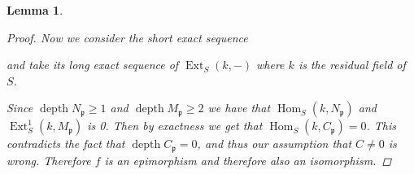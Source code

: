 \documentclass[11pt, a4paper, english]{article}
\numberwithin{prop}{section}
\newtheorem{lemma}{Lemma}
\numberwithin{lemma}{section}
\numberwithin{theorem}{section}
\numberwithin{defin}{section}
\numberwithin{example}{section}
\DeclareMathOperator{\Hom}{Hom}
\DeclareMathOperator{\Ext}{Ext}
\DeclareMathOperator{\depth}{depth}
\begin{document}
\begin{lemma}
\begin{proof}
Now we consider the short exact sequence
\begin{center}
\end{center}
and take its long exact sequence of $\Ext_S(k, -)$ where $k$ is the residual field of $S$.
\begin{center}
\end{center}
Since $\depth N_\mathfrak{p} \geq 1$ and $\depth M_\mathfrak{p} \geq 2$ we have that $\Hom_S(k, N_\mathfrak{p})$ and $\Ext^1_S(k, M_\mathfrak{p})$ is 0. Then by exactness we get that $\Hom_S(k, C_\mathfrak{p}) = 0$. This contradicts the fact that $\depth C_\mathfrak{p} = 0$, and thus our assumption that $C \neq 0$ is wrong. Therefore $f$ is an epimorphism and therefore also an isomorphism.
\end{proof}
\end{lemma}
\end{document}
